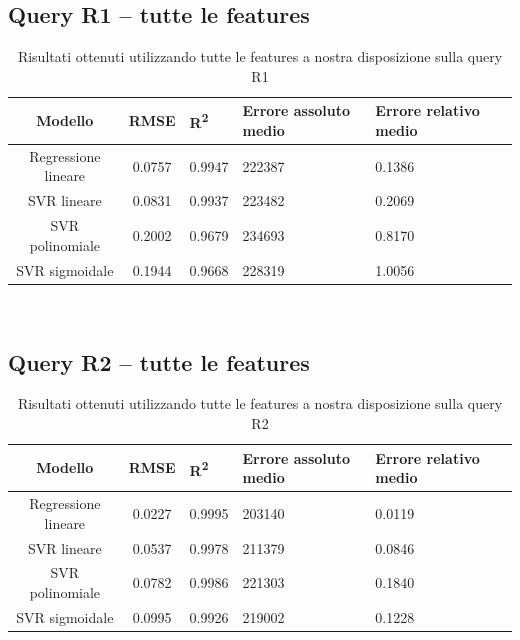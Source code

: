 \documentclass[a4paper,11pt]{article}
\begin{document}
\subsection{Query R1 -- tutte le features}
\begin{table}[hbpt]
	\centering
	\begin{adjustbox}{center}
		\begin{tabular}{c | c M{1.2cm} M{2.5cm} M{2.5cm} M{1.8cm}}
			Modello & RMSE & R\textsuperscript{2} & Errore assoluto medio & Errore relativo medio \tabularnewline
			\hline
			Regressione lineare & 0.0757 & 0.9947 & 222387 & 0.1386 \\
			SVR lineare & 0.0831 & 0.9937 & 223482 & 0.2069 \\
			SVR polinomiale & 0.2002 & 0.9679 & 234693 & 0.8170 \\
			SVR sigmoidale & 0.1944 & 0.9668 & 228319 & 1.0056 \\
		\end{tabular}
	\end{adjustbox}
	\\
	\caption{Risultati ottenuti utilizzando tutte le features a nostra disposizione sulla query R1}
	\label{table_all_features_R1}
\end{table}

\subsection{Query R2 -- tutte le features}
\begin{table}[hbpt]
	\centering
	\begin{adjustbox}{center}
		\begin{tabular}{c | c M{1.2cm} M{2.5cm} M{2.5cm} M{1.8cm}}
			Modello & RMSE & R\textsuperscript{2} & Errore assoluto medio & Errore relativo medio \tabularnewline
			\hline
			Regressione lineare & 0.0227 & 0.9995 & 203140 & 0.0119 \\
			SVR lineare & 0.0537 & 0.9978 & 211379 & 0.0846 \\
			SVR polinomiale & 0.0782 & 0.9986 & 221303 & 0.1840 \\
			SVR sigmoidale & 0.0995 & 0.9926 & 219002 & 0.1228 \\
		\end{tabular}
	\end{adjustbox}
	\\
	\caption{Risultati ottenuti utilizzando tutte le features a nostra disposizione sulla query R2}
	\label{table_all_features_R2}
\end{table}
\end{document}
